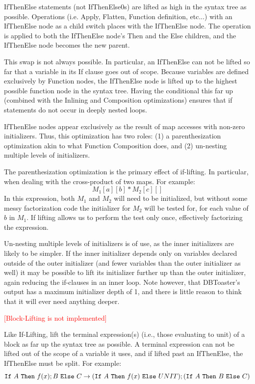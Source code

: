\documentclass[11pt]{amsart}
\newcommand{\todo}[1]{\textcolor{red}{[#1]}}
\newcommand{\parsection}[1]{\smallskip\noindent{\bf #1.}}
\begin{document}
\parsection{If-Lifting}
IfThenElse statements (not IfThenElse0s) are lifted as high in the syntax tree as possible.  Operations (i.e. Apply, Flatten, Function definition, etc...) with an IfThenElse node as a child switch places with the IfThenElse node.  The operation is applied to both the IfThenElse node's Then and the Else children, and the IfThenElse node becomes the new parent.

This swap is not always possible.  In particular, an IfThenElse can not be lifted so far that a variable in its If clause goes out of scope.  Because variables are defined exclusively by Function nodes, the IfThenElse node is lifted up to the highest possible function node in the syntax tree.  Having the conditional this far up (combined with the Inlining and Composition optimizations) ensures that if statements do not occur in deeply nested loops.

IfThenElse nodes appear exclusively as the result of map accesses with non-zero initializers.  Thus, this optimization has two roles: (1) a parenthesization optimization akin to what Function Composition does, and (2) un-nesting multiple levels of initializers.

The parenthesization optimization is the primary effect of if-lifting.  In particular, when dealing with the cross-product of two maps.  For example:
$$M_1[a][b] * M_2[c][]$$
In this expression, both $M_1$ and $M_2$ will need to be initialized, but without some messy factorization code the initializer for $M_2$ will be tested for, for each value of $b$ in $M_1$.   If lifting allows us to perform the test only once, effectively factorizing the expression.

Un-nesting multiple levels of initializers is of use, as the inner initializers are likely to be simpler.  If the inner initializer depends only on variables declared outside of the outer initializer (and fewer variables than the outer initializer as well) it may be possible to lift its initializer further up than the outer initializer, again reducing the if-clauses in an inner loop.  Note however, that DBToaster's output has a maximum initializer depth of 1, and there is little reason to think that it will ever need anything deeper.

\parsection{Block-Lifting}
\todo{Block-Lifting is not implemented}

Like If-Lifting, lift the terminal expression(s) (i.e., those evaluating to unit) of a block as far up the syntax tree as possible.  A terminal expression can not be lifted out of the scope of a variable it uses, and if lifted past an IfThenElse, the IfThenElse must be split.  For example:
$${\tt If}\ A\ {\tt Then}\ f(x) ; B\ {\tt Else}\ C \rightarrow ({\tt If}\ A\ {\tt Then}\ f(x) \ {\tt Else}\ UNIT) ; ({\tt If}\ A\ {\tt Then}\ B\ {\tt Else}\ C ) $$
\end{document}
